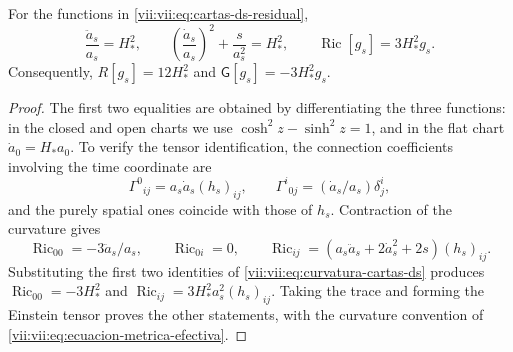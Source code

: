 \begin{lemma}
\label{vii:vii:lem:curvatura-cartas-ds}
For the functions in \eqref{vii:vii:eq:cartas-ds-residual},
\begin{equation}
 \frac{\ddot a_s}{a_s}=H_*^2,\qquad
 \left(\frac{\dot a_s}{a_s}\right)^2+\frac{s}{a_s^2}=H_*^2,
 \qquad
 \operatorname{Ric}[g_s]=3H_*^2g_s.
 \label{vii:vii:eq:curvatura-cartas-ds}
\end{equation}
Consequently, \(R[g_s]=12H_*^2\) and
\(\mathsf G[g_s]=-3H_*^2g_s\).
\end{lemma}
\begin{proof}
The first two equalities are obtained by differentiating the three functions:
in the closed and open charts we use
\(\cosh^2z-\sinh^2z=1\), and in the flat chart
\(\dot a_0=H_*a_0\). To verify the tensor identification,
the connection coefficients involving the time coordinate are
\[
 \Gamma^0{}_{ij}=a_s\dot a_s(h_s)_{ij},\qquad
 \Gamma^i{}_{0j}=(\dot a_s/a_s)\delta^i_j,
\]
and the purely spatial ones coincide with those of \(h_s\).
Contraction of the curvature gives
\[
 \operatorname{Ric}_{00}=-3\ddot a_s/a_s,\qquad
 \operatorname{Ric}_{0i}=0,\qquad
 \operatorname{Ric}_{ij}
  =(a_s\ddot a_s+2\dot a_s^2+2s)(h_s)_{ij}.
\]
Substituting the first two identities of
\eqref{vii:vii:eq:curvatura-cartas-ds} produces
\(\operatorname{Ric}_{00}=-3H_*^2\) and
\(\operatorname{Ric}_{ij}=3H_*^2a_s^2(h_s)_{ij}\).
Taking the trace and forming the Einstein tensor proves the other
statements, with the curvature convention of
\eqref{vii:vii:eq:ecuacion-metrica-efectiva}.
\end{proof}

